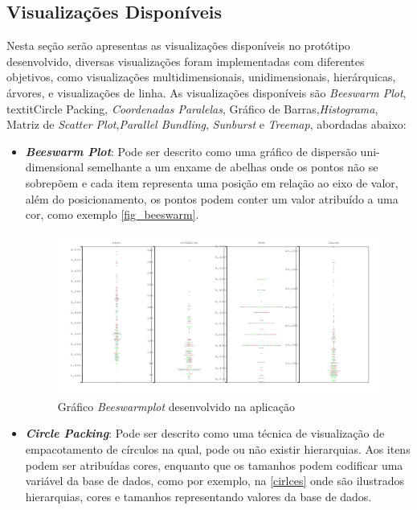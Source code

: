 \documentclass[
	12pt,				%
	openright,			%
	oneside,			%
	a4paper,			%
	english,			%
	brazil				%
	]{abntex2}
\begin{document}
\subsection{Visualizações Disponíveis}
Nesta seção serão apresentas as visualizações disponíveis no protótipo desenvolvido, diversas visualizações foram implementadas com diferentes objetivos, como visualizações multidimensionais, unidimensionais, hierárquicas, árvores, e visualizações de linha. As visualizações disponíveis são \textit{Beeswarm Plot}, textit{Circle Packing}, \textit{Coordenadas Paralelas}, Gráfico de Barras,\textit{Histograma}, Matriz de \textit{Scatter Plot},\textit{Parallel Bundling}, \textit{Sunburst} e \textit{Treemap}, abordadas abaixo: 

\begin{itemize}
    \item  \textbf{\textit{Beeswarm Plot}}:
    Pode ser descrito como uma gráfico de dispersão uni-dimensional semelhante a um enxame de abelhas onde os pontos não se sobrepõem e cada item representa uma posição em relação ao eixo de valor, além do posicionamento, os pontos podem conter um valor atribuído a uma cor, como exemplo \autoref{fig_beeswarm}.
    
    \begin{figure}
	\caption{\label{fig_beeswarm} Gráfico \textit{Beeswarmplot} desenvolvido na aplicação}
	\begin{center}
	    \includegraphics[width=40pc,size=1]{figures/bewarmplot.pdf}
	\end{center}
\end{figure}
    
    \item  \textbf{\textit{Circle Packing}}:
    Pode ser descrito como uma técnica de visualização de empacotamento de círculos na qual, pode ou não existir hierarquias. Aos itens podem ser atribuídas cores, enquanto que os tamanhos podem codificar uma variável da base de dados, como por exemplo, na \autoref{cirlces} onde são ilustrados hierarquias, cores e tamanhos representando valores da base de dados. 
    

\end{itemize}
\end{document}
